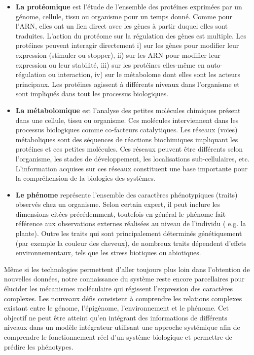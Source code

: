 \begin{itemize}
    \item \textbf{La protéomique} est l'étude de l'ensemble des protéines exprimées par un génome, cellule, tissu ou organisme pour un temps donné. Comme pour l'ARN, elles ont un lien direct avec les gènes à partir duquel elles sont traduites. L'action du protéome sur la régulation des gènes est multiple. Les protéines peuvent interagir directement i)  sur les gènes pour modifier leur expression (stimuler ou stopper), ii) sur les ARN pour modifier leur expression ou leur stabilité, iii) sur les protéines elles-même en auto-régulation ou interaction, iv) sur le métabolome dont elles sont les acteurs principaux. Les protéines agissent à différents niveaux dans l'organisme et sont impliqués dans tout les processus biologiques.  \\
    
    \item \textbf{La métabolomique} est l'analyse des petites molécules chimiques présent dans une cellule, tissu ou organisme. Ces molécules interviennent dans les processus biologiques comme co-facteurs catalytiques. Les réseaux (voies) métaboliques sont des séquences de réactions biochimiques impliquant les protéines et ces petites molécules. Ces réseaux peuvent être différents selon l'organisme, les stades de développement, les localisations sub-cellulaires, etc. L'information acquises sur ces réseaux constituent une base importante pour la compréhension de la biologies des systèmes.\\
    
    \item \textbf{Le phénome} représente l'ensemble des caractères phénotypiques (traits) observés chez un organisme. Selon certain expert, il peut inclure les dimensions citées précédemment, toutefois en général le phénome fait référence aux observations externes réalisées au niveau de l'individu ( e.g. la plante). Outre les traits qui sont principalement déterminés génétiquement (par exemple la couleur des cheveux), de nombreux traits dépendent d'effets environnementaux, tels que les stress biotiques ou abiotiques.\\
\end{itemize}


 
Même si les technologies permettent d'aller toujours plus loin dans l'obtention de nouvelles données, notre connaissance du système reste encore parcellaires pour élucider les mécanismes moléculaire qui régissent l'expression des caractères complexes. Les nouveaux défis consistent à comprendre les relations complexes existant entre le génome, l'épigénome, l'environnement et le phénome. Cet objectif ne peut être atteint qu'en intégrant des informations de différents niveaux dans un modèle intégrateur utilisant une approche systémique afin de comprendre le fonctionnement réel d'un système biologique et permettre de prédire les phénotypes. 

